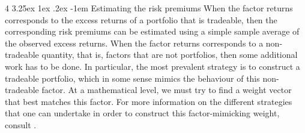 \documentclass[12pt]{article}
\makeatletter
\newtheorem{remark}{Remark}[section]
\renewcommand\paragraph{%
	\@startsection{paragraph}
	{4}
	{\z@}
	{3.25ex \@plus1ex \@minus.2ex}
	{-1em}
	{\normalfont\normalsize\bfseries\maybe@addperiod}%
}
\newcommand{\maybe@addperiod}[1]{%
	#1\@addpunct{.}%
}
\makeatother
\begin{document}

\paragraph{Estimating the risk premiums} When the factor returns corresponds to the excess returns of a portfolio that is tradeable, then the corresponding risk premiums can be estimated using a simple sample average of the observed excess returns. When the factor returns corresponds to a non-tradeable quantity, that is, factors that are not portfolios, then some additional work has to be done. In particular, the most prevalent strategy is to construct a tradeable portfolio, which in some sense mimics the behaviour of this non-tradeable factor. At a mathematical level, we must try to find a weight vector that best matches this factor. For more information on the different strategies that one can undertake in order to construct this factor-mimicking weight, consult \citet[Section 3.3]{giglio2022arfe}.
\end{document}
